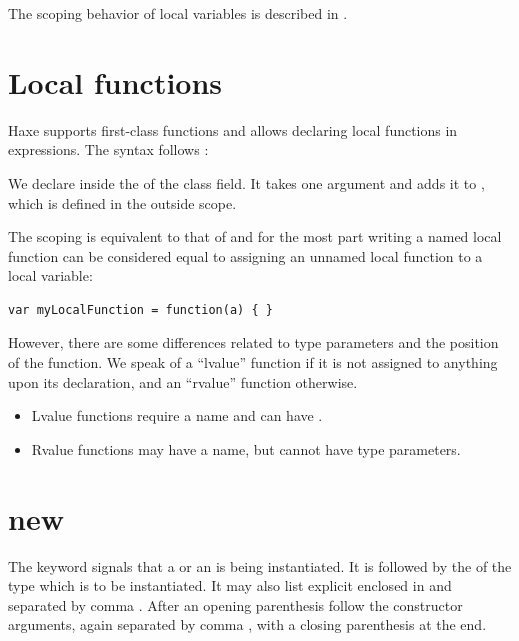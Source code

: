 \documentclass{haxe}
\begin{document}
The scoping behavior of local variables is described in .


\section{Local functions}
\label{expression-function}

Haxe supports first-class functions and allows declaring local functions in expressions. The syntax follows :


We declare  inside the  of the  class field. It takes one argument  and adds it to , which is defined in the outside scope.

The scoping is equivalent to that of  and for the most part writing a named local function can be considered equal to assigning an unnamed local function to a local variable:

\begin{lstlisting}
var myLocalFunction = function(a) { }
\end{lstlisting}

However, there are some differences related to type parameters and the position of the function. We speak of a ``lvalue'' function if it is not assigned to anything upon its declaration, and an ``rvalue'' function otherwise.

\begin{itemize}
	\item Lvalue functions require a name and can have .
	\item Rvalue functions may have a name, but cannot have type parameters.
\end{itemize}


\section{new}
\label{expression-new}

The  keyword signals that a  or an  is being instantiated. It is followed by the  of the type which is to be instantiated. It may also list explicit  enclosed in \expr{<>} and separated by comma \expr{,}. After an opening parenthesis \expr{()} follow the constructor arguments, again separated by comma \expr{,}, with a closing parenthesis \expr{)} at the end.
\end{document}

